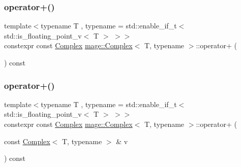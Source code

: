 \subsubsection{\texorpdfstring{operator+()}{operator+()}\hspace{0.1cm}{\footnotesize\ttfamily [1/3]}}
{\footnotesize\ttfamily template$<$typename T , typename  = std\+::enable\+\_\+if\+\_\+t$<$ std\+::is\+\_\+floating\+\_\+point\+\_\+v$<$ T $>$ $>$$>$ \\
constexpr const \mbox{\hyperlink{structmage_1_1_complex}{Complex}} \mbox{\hyperlink{structmage_1_1_complex}{mage\+::\+Complex}}$<$ T, typename $>$\+::operator+ (\begin{DoxyParamCaption}{ }\end{DoxyParamCaption}) const\hspace{0.3cm}{\ttfamily [noexcept]}}

\mbox{\label{structmage_1_1_complex_a97455a61c533f667cf9127a204dc16b4}} 
\subsubsection{\texorpdfstring{operator+()}{operator+()}\hspace{0.1cm}{\footnotesize\ttfamily [2/3]}}
{\footnotesize\ttfamily template$<$typename T , typename  = std\+::enable\+\_\+if\+\_\+t$<$ std\+::is\+\_\+floating\+\_\+point\+\_\+v$<$ T $>$ $>$$>$ \\
constexpr const \mbox{\hyperlink{structmage_1_1_complex}{Complex}} \mbox{\hyperlink{structmage_1_1_complex}{mage\+::\+Complex}}$<$ T, typename $>$\+::operator+ (\begin{DoxyParamCaption}\item[{const \mbox{\hyperlink{structmage_1_1_complex}{Complex}}$<$ T, typename $>$ \&}]{v }\end{DoxyParamCaption}) const\hspace{0.3cm}{\ttfamily [noexcept]}}

\mbox{\label{structmage_1_1_complex_a4eec18bc848f0b50326d30f91ac98a26}} 

